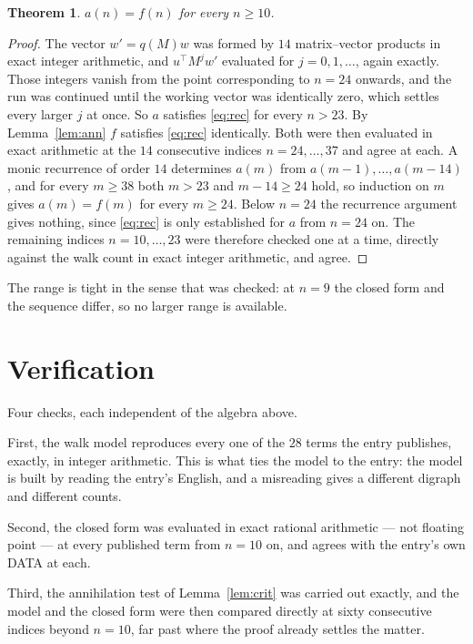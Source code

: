 \documentclass[11pt,a4paper]{article}
\theoremstyle{plain}
\newtheorem{theorem}{Theorem}
\theoremstyle{definition}
\begin{document}
\begin{theorem}
$a(n)=f(n)$ for every $n\ge10$.
\end{theorem}

\begin{proof}
The vector $w'=q(M)w$ was formed by $14$ matrix--vector products in exact integer
arithmetic, and $u^{\!\top}M^{j}w'$ evaluated for $j=0,1,\dots$, again exactly. Those integers
vanish from the point corresponding to $n=24$ onwards, and the run was continued until the
working vector was identically zero, which settles every larger $j$ at once. So $a$ satisfies
\eqref{eq:rec} for every $n>23$. By Lemma~\ref{lem:ann} $f$ satisfies \eqref{eq:rec}
identically. Both were then evaluated in exact arithmetic at the $14$ consecutive indices
$n=24,\dots,37$ and agree at each. A monic recurrence of order $14$
determines $a(m)$ from $a(m-1),\dots,a(m-14)$, and for every $m\ge38$ both
$m>23$ and $m-14\ge24$ hold, so induction on $m$ gives $a(m)=f(m)$ for every
$m\ge24$.
Below $n=24$ the recurrence argument gives nothing, since \eqref{eq:rec} is only
established for $a$ from $n=24$ on. The remaining indices $n=10,\dots,23$ were
therefore checked one at a time, directly against the walk count in exact integer arithmetic,
and agree.
\end{proof}

The range is tight in the sense that was checked: at $n=9$ the closed form and the sequence differ, so no larger range is available.

\section{Verification}

Four checks, each independent of the algebra above.

First, the walk model reproduces every one of the $28$ terms the entry publishes,
exactly, in integer arithmetic. This is what ties the model to the entry: the model is built
by reading the entry's English, and a misreading gives a different digraph and different
counts.

Second, the closed form was evaluated in exact rational arithmetic --- not floating point ---
at every published term from $n=10$ on, and agrees with the entry's own DATA at each.

Third, the annihilation test of Lemma~\ref{lem:crit} was carried out exactly, and the model
and the closed form were then compared directly at sixty consecutive indices beyond
$n=10$, far past where the proof already settles the matter.
\end{document}
